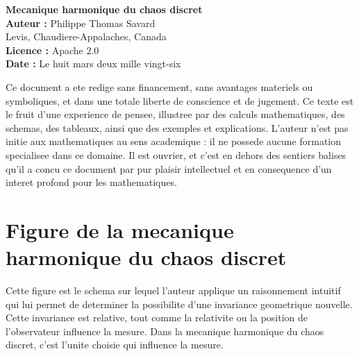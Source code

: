 \documentclass[12pt,a4paper]{article}
\theoremstyle{definition}
\theoremstyle{remark}
\begin{document}
\tableofcontents
\clearpage

\begin{titlepage}
    \centering

    {\Huge \textbf{Mecanique harmonique du chaos discret}}\\[1.5cm]

    {\Large \textbf{Auteur :} Philippe Thomas Savard}\\[0.3cm]
    {\large Levis, Chaudiere-Appalaches, Canada}\\[0.8cm]

    {\large \textbf{Licence :} Apache 2.0}\\[0.8cm]

    {\large \textbf{Date :} Le huit mars deux mille vingt-six}\\[2cm]

    \vfill
\end{titlepage}


\vspace{0.5cm}

Ce document a ete redige sans financement, sans avantages materiels ou symboliques,
et dans une totale liberte de conscience et de jugement.
Ce texte est le fruit d'une experience de pensee, illustree par des calculs mathematiques,
des schemas, des tableaux, ainsi que des exemples et explications.
L'auteur n'est pas initie aux mathematiques au sens academique :
il ne possede aucune formation specialisee dans ce domaine.
Il est ouvrier, et c'est en dehors des sentiers balises qu'il a concu ce document
par pur plaisir intellectuel et en consequence d'un interet profond pour les mathematiques.

\vspace{0.5cm}


\section{Figure de la mecanique harmonique du chaos discret}

Cette figure est le schema sur lequel l'auteur applique un raisonnement intuitif
qui lui permet de determiner la possibilite d'une invariance geometrique nouvelle.
Cette invariance est relative, tout comme la relativite ou la position de l'observateur
influence la mesure. Dans la mecanique harmonique du chaos discret,
c'est l'unite choisie qui influence la mesure.
\end{document}
